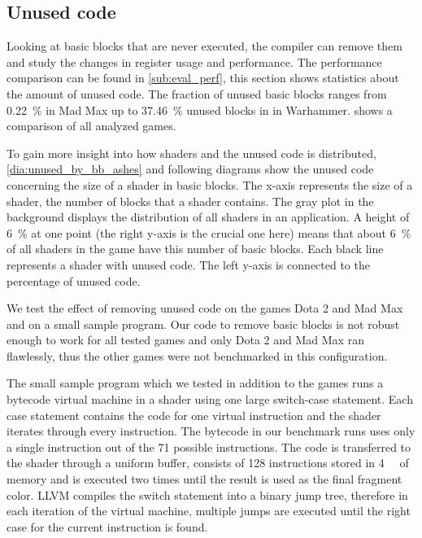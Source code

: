 \subsection{Unused code}
\label{sub:eval_unused}
Looking at basic blocks that are never executed, the compiler can remove them and study the changes in register usage and performance.
The performance comparison can be found in \cref{sub:eval_perf}, this section shows statistics about the amount of unused code.
The fraction of unused basic blocks ranges from \SI{0.22}{\percent} in Mad Max up to \SI{37.46}{\percent} unused blocks in in Warhammer.
 shows a comparison of all analyzed games.


To gain more insight into how shaders and the unused code is distributed, \cref{dia:unused_by_bb_ashes} and following diagrams show the unused code concerning the size of a shader in basic blocks.
The x-axis represents the size of a shader, the number of blocks that a shader contains.
The gray plot in the background displays the distribution of all shaders in an application.
A height of \SI{6}{\percent} at one point (the right y-axis is the crucial one here) means that about \SI{6}{\percent} of all shaders in the game have this number of basic blocks.
Each black line represents a shader with unused code. The left y-axis is connected to the percentage of unused code.


We test the effect of removing unused code on the games Dota 2 and Mad Max and on a small sample program.
Our code to remove basic blocks is not robust enough to work for all tested games and only Dota 2 and Mad Max ran flawlessly, thus the other games were not benchmarked in this configuration.

The small sample program which we tested in addition to the games runs a bytecode virtual machine in a shader using one large switch-case statement.
Each case statement contains the code for one virtual instruction and the shader iterates through every instruction.
The bytecode in our benchmark runs uses only a single instruction out of the 71 possible instructions.
The code is transferred to the shader through a uniform buffer, consists of 128 instructions stored in \SI{4}{\kibi\byte} of memory and is executed two times until the result is used as the final fragment color.
LLVM compiles the switch statement into a binary jump tree, therefore in each iteration of the virtual machine, multiple jumps are executed until the right case for the current instruction is found.

